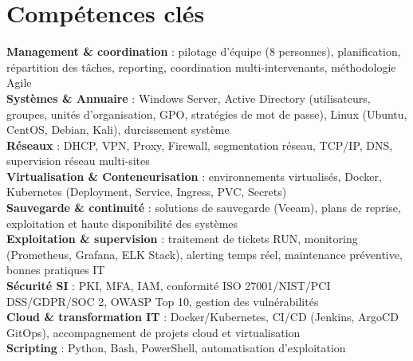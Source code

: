\documentclass[a4paper,9pt]{article}
\begin{document}
\section{Compétences clés}
\textbf{Management \& coordination} : pilotage d'équipe (8 personnes), planification, répartition des tâches, reporting, coordination multi-intervenants, méthodologie Agile\\[0.3pt]
\textbf{Systèmes \& Annuaire} : Windows Server, Active Directory (utilisateurs, groupes, unités d'organisation, GPO, stratégies de mot de passe), Linux (Ubuntu, CentOS, Debian, Kali), durcissement système\\[0.3pt]
\textbf{Réseaux} : DHCP, VPN, Proxy, Firewall, segmentation réseau, TCP/IP, DNS, supervision réseau multi-sites\\[0.3pt]
\textbf{Virtualisation \& Conteneurisation} : environnements virtualisés, Docker, Kubernetes (Deployment, Service, Ingress, PVC, Secrets)\\[0.3pt]
\textbf{Sauvegarde \& continuité} : solutions de sauvegarde (Veeam), plans de reprise, exploitation et haute disponibilité des systèmes\\[0.3pt]
\textbf{Exploitation \& supervision} : traitement de tickets RUN, monitoring (Prometheus, Grafana, ELK Stack), alerting temps réel, maintenance préventive, bonnes pratiques IT\\[0.3pt]
\textbf{Sécurité SI} : PKI, MFA, IAM, conformité ISO 27001/NIST/PCI DSS/GDPR/SOC 2, OWASP Top 10, gestion des vulnérabilités\\[0.3pt]
\textbf{Cloud \& transformation IT} : Docker/Kubernetes, CI/CD (Jenkins, ArgoCD GitOps), accompagnement de projets cloud et virtualisation\\[0.3pt]
\textbf{Scripting} : Python, Bash, PowerShell, automatisation d'exploitation
\end{document}
